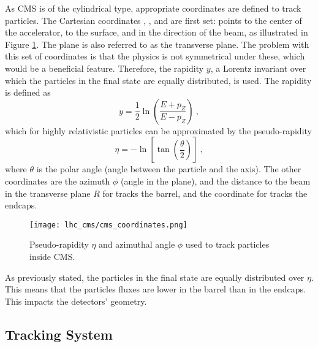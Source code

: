             As CMS is of the cylindrical type, appropriate coordinates are defined to track particles. The Cartesian coordinates , , and  are first set:  points to the center of the accelerator,  to the surface, and  in the direction of the beam, as illustrated in Figure \ref{fig:lhc_and_cms__cms_coordinates}. The  plane is also referred to as the transverse plane. The problem with this set of coordinates is that the physics is not symmetrical under these, which would be a beneficial feature. Therefore, the rapidity $ y $, a Lorentz invariant over which the particles in the final state are equally distributed, is used. The rapidity is defined as 
            \begin{equation}
                y = \frac{1}{2} \ln \left( \frac{E + p_Z}{E - p_Z} \right) \ ,
            \end{equation}
            which for highly relativistic particles can be approximated by the pseudo-rapidity
            \begin{equation}
                \eta = - \ln \left[ \tan \left( \frac{\theta}{2} \right) \right] \ ,
            \end{equation}
            where $ \theta $ is the polar angle (angle between the particle and the  axis). The other coordinates are the azimuth $ \phi $ (angle in the  plane), and the distance to the beam in the transverse plane $ R $ for tracks the barrel, and the  coordinate for tracks the endcaps. \\

            \begin{figure}[h!]
                \centering
                \texttt{[image: lhc\_cms/cms\_coordinates.png]}
                \caption{Pseudo-rapidity $ \eta $ and azimuthal angle $ \phi $ used to track particles inside CMS.}
                \label{fig:lhc_and_cms__cms_coordinates}
            \end{figure}        

            As previously stated, the particles in the final state are equally distributed over $ \eta $. This means that the particles fluxes are lower in the barrel than in the endcaps. This impacts the detectors' geometry.

        \subsection{Tracking System}

